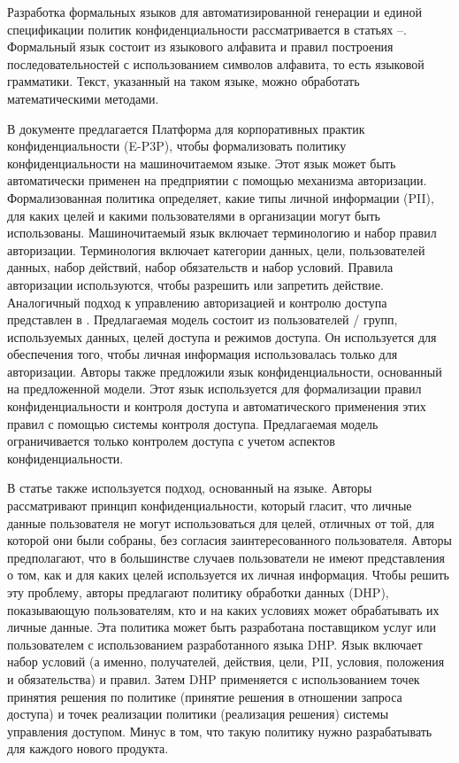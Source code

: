 \documentclass[../main]{subfiles}
\begin{document}
Разработка формальных языков для автоматизированной генерации и единой спецификации политик конфиденциальности рассматривается в статьях \cite{MDPI11}--\cite{MDPI15}. Формальный язык состоит из языкового алфавита и правил построения последовательностей с использованием символов алфавита, то есть языковой грамматики. Текст, указанный на таком языке, можно обработать математическими методами.

В документе \cite{MDPI11} предлагается Платформа для корпоративных практик конфиденциальности (E-P3P), чтобы формализовать политику конфиденциальности на машиночитаемом языке. Этот язык может быть автоматически применен на предприятии с помощью механизма авторизации. Формализованная политика определяет, какие типы личной информации (PII), для каких целей и какими пользователями в организации могут быть использованы. Машиночитаемый язык включает терминологию и набор правил авторизации. Терминология включает категории данных, цели, пользователей данных, набор действий, набор обязательств и набор условий. Правила авторизации используются, чтобы разрешить или запретить действие. Аналогичный подход к управлению авторизацией и контролю доступа представлен в \cite{MDPI12}. Предлагаемая модель состоит из пользователей / групп, используемых данных, целей доступа и режимов доступа. Он используется для обеспечения того, чтобы личная информация использовалась только для авторизации. Авторы \cite{MDPI12} также предложили язык конфиденциальности, основанный на предложенной модели. Этот язык используется для формализации правил конфиденциальности и контроля доступа и автоматического применения этих правил с помощью системы контроля доступа. Предлагаемая модель ограничивается только контролем доступа с учетом аспектов конфиденциальности.

В статье \cite{MDPI13} также используется подход, основанный на языке. Авторы \cite{MDPI13} рассматривают принцип конфиденциальности, который гласит, что личные данные пользователя не могут использоваться для целей, отличных от той, для которой они были собраны, без согласия заинтересованного пользователя. Авторы \cite{MDPI13} предполагают, что в большинстве случаев пользователи не имеют представления о том, как и для каких целей используется их личная информация. Чтобы решить эту проблему, авторы предлагают политику обработки данных (DHP), показывающую пользователям, кто и на каких условиях может обрабатывать их личные данные. Эта политика может быть разработана поставщиком услуг или пользователем с использованием разработанного языка DHP. Язык включает набор условий (а именно, получателей, действия, цели, PII, условия, положения и обязательства) и правил. Затем DHP применяется с использованием точек принятия решения по политике (принятие решения в отношении запроса доступа) и точек реализации политики (реализация решения) системы управления доступом. Минус в том, что такую ​​политику нужно разрабатывать для каждого нового продукта.
\end{document}
